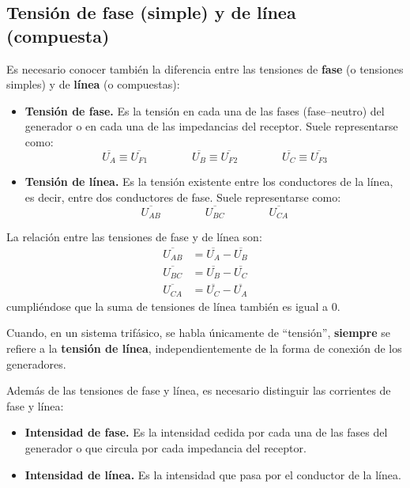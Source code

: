 	\subsection{Tensión de fase (simple) y de línea (compuesta)}\label{sec.fase_linea}
	Es necesario conocer también la diferencia entre las tensiones de \textbf{fase} (o tensiones simples) y de \textbf{línea} (o compuestas):
	\begin{itemize}
		\item \textbf{Tensión de fase.} Es la tensión en cada una de las fases (fase--neutro) del generador o en cada una de las impedancias del receptor. Suele representarse como: 
		\begin{equation*}
			\overline{U_A}\equiv \overline{U_{F1}} \qquad \qquad \overline{U_B}\equiv \overline{U_{F2}} \qquad \qquad \overline{U_C} \equiv \overline{U_{F3}} 
		\end{equation*}
		\item \textbf{Tensión de línea.} Es la tensión existente entre los conductores de la línea, es decir, entre dos conductores de fase. Suele representarse como: 
		\begin{equation*}
			\overline{U_{AB}} \qquad \qquad \overline{U_{BC}} \qquad \qquad \overline{U_{CA}} 
		\end{equation*}
	\end{itemize}
	La relación entre las tensiones de fase y de línea son: 
	\begin{align}\label{eq.tensionFL}
		\overline{U_{AB}} &= \overline{U_A} - \overline{U_B}\\
		\overline{U_{BC}} &= \overline{U_B} - \overline{U_C}\\
		\overline{U_{CA}} &= \overline{U_C} - \overline{U_A}
	\end{align}
	cumpliéndose que la suma de tensiones de línea también es igual a 0. 
	\begin{remark}
	    Cuando, en un sistema trifásico, se habla únicamente de ``tensión'', \textbf{siempre} se refiere a la \textbf{tensión de línea}, independientemente de la forma de conexión de los generadores.
	\end{remark}
	
	Además de las tensiones de fase y línea, es necesario distinguir las corrientes de fase y línea:
	\begin{itemize}
		\item \textbf{Intensidad de fase.} Es la intensidad cedida por cada una de las fases del generador o que circula por cada impedancia del receptor. 
		\item \textbf{Intensidad de línea.} Es la intensidad que pasa por el conductor de la línea. 
	\end{itemize}
	
